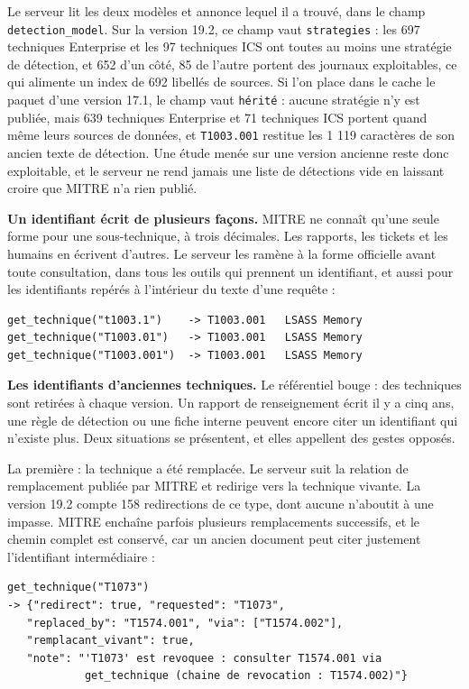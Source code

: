 Le serveur lit les deux modèles et annonce lequel il a trouvé, dans le champ \texttt{detection\_model}. Sur la version 19.2, ce champ vaut \texttt{strategies} : les 697 techniques Enterprise et les 97 techniques ICS ont toutes au moins une stratégie de détection, et 652 d'un côté, 85 de l'autre portent des journaux exploitables, ce qui alimente un index de 692 libellés de sources. Si l'on place dans le cache le paquet d'une version 17.1, le champ vaut \texttt{hérité} : aucune stratégie n'y est publiée, mais 639 techniques Enterprise et 71 techniques ICS portent quand même leurs sources de données, et \texttt{T1003.001} restitue les 1 119 caractères de son ancien texte de détection. Une étude menée sur une version ancienne reste donc exploitable, et le serveur ne rend jamais une liste de détections vide en laissant croire que MITRE n'a rien publié.

\textbf{Un identifiant écrit de plusieurs façons.} MITRE ne connaît qu'une seule forme pour une sous-technique, à trois décimales. Les rapports, les tickets et les humains en écrivent d'autres. Le serveur les ramène à la forme officielle avant toute consultation, dans tous les outils qui prennent un identifiant, et aussi pour les identifiants repérés à l'intérieur du texte d'une requête :

\begin{verbatim}
get_technique("t1003.1")    -> T1003.001   LSASS Memory
get_technique("T1003.01")   -> T1003.001   LSASS Memory
get_technique("T1003.001")  -> T1003.001   LSASS Memory
\end{verbatim}

\textbf{Les identifiants d'anciennes techniques.} Le référentiel bouge : des techniques sont retirées à chaque version. Un rapport de renseignement écrit il y a cinq ans, une règle de détection ou une fiche interne peuvent encore citer un identifiant qui n'existe plus. Deux situations se présentent, et elles appellent des gestes opposés.

La première : la technique a été remplacée. Le serveur suit la relation de remplacement publiée par MITRE et redirige vers la technique vivante. La version 19.2 compte 158 redirections de ce type, dont aucune n'aboutit à une impasse. MITRE enchaîne parfois plusieurs remplacements successifs, et le chemin complet est conservé, car un ancien document peut citer justement l'identifiant intermédiaire :

\begin{verbatim}
get_technique("T1073")
-> {"redirect": true, "requested": "T1073",
   "replaced_by": "T1574.001", "via": ["T1574.002"],
   "remplacant_vivant": true,
   "note": "'T1073' est revoquee : consulter T1574.001 via
            get_technique (chaine de revocation : T1574.002)"}
\end{verbatim}


